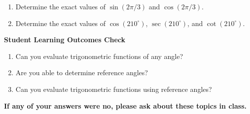 \begin{enumerate}
\item Determine the exact values of $\sin(2\pi/3)$ and $\cos(2\pi/3)$. \\[1.5in] %


\item Determine the exact values of $\cos(210^\circ)$, $\sec(210^\circ)$, and $\cot(210^\circ)$. \\[1.5in]
\vfill
%
%
%
%


\end{enumerate}

\noindent \textbf{Student Learning Outcomes Check}

\begin{enumerate}
\item Can you evaluate trigonometric functions of any angle?
\item Are you able to determine reference angles?
\item Can you evaluate trigonometric functions using reference angles?
\end{enumerate}

\noindent \textbf{If any of your answers were no, please ask about these topics in class.}


